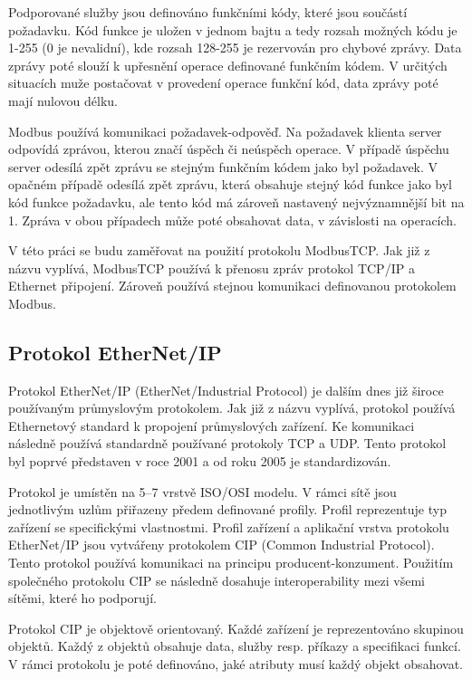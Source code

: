 Podporované služby jsou definováno funkčními kódy, které jsou součástí požadavku. Kód funkce je uložen v jednom bajtu a tedy rozsah možných kódu je 1-255 (0 je nevalidní), kde rozsah 128-255 je rezervován pro chybové zprávy. Data zprávy poté slouží k upřesnění operace definované funkčním kódem. V určitých situacích muže postačovat v provedení operace funkční kód, data zprávy poté mají nulovou délku.

Modbus používá komunikaci požadavek-odpověď. Na požadavek klienta server odpovídá zprávou, kterou značí úspěch či neúspěch operace. V případě úspěchu server odesílá zpět zprávu se stejným funkčním kódem jako byl požadavek. V opačném případě odesílá zpět zprávu, která obsahuje stejný kód funkce jako byl kód funkce požadavku, ale tento kód má zároveň nastavený nejvýznamnější bit na 1. Zpráva v obou případech může poté obsahovat data, v závislosti na operacích. \cite{modbus}

V této práci se budu zaměřovat na použití protokolu ModbusTCP. Jak již z názvu vyplívá, ModbusTCP používá k přenosu zpráv protokol TCP/IP a Ethernet připojení. Zároveň používá stejnou komunikaci definovanou protokolem Modbus.

\subsection{Protokol EtherNet/IP}
Protokol EtherNet/IP (EtherNet/Industrial Protocol) je dalším dnes již široce používaným průmyslovým protokolem. Jak již z názvu vyplívá, protokol používá Ethernetový standard k propojení průmyslových zařízení. Ke komunikaci následně používá standardně používané protokoly TCP a UDP. Tento protokol byl poprvé představen v roce 2001 a od roku 2005 je standardizován. 

Protokol je umístěn na 5--7 vrstvě ISO/OSI modelu. V rámci sítě jsou jednotlivým uzlům přiřazeny předem definované profily. Profil reprezentuje typ zařízení se specifickými vlastnostmi. Profil zařízení a aplikační vrstva protokolu EtherNet/IP jsou vytvářeny protokolem CIP (Common Industrial Protocol). Tento protokol používá komunikaci na principu producent-konzument. Použitím společného protokolu CIP se následně dosahuje interoperability mezi všemi sítěmi, které ho podporují. 

Protokol CIP je objektově orientovaný. Každé zařízení je reprezentováno skupinou objektů. Každý z objektů obsahuje data, služby resp. příkazy a specifikaci funkcí. V rámci protokolu je poté definováno, jaké atributy musí každý objekt obsahovat.

